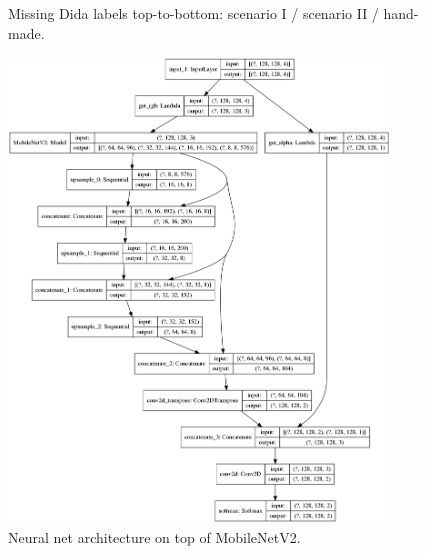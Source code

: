 \documentclass[12pt,a4paper]{article}
\begin{document}
\begin{figure}[p]
        \caption{Missing Dida labels top-to-bottom:
        scenario I / scenario II / hand-made.}
        \label{f:labels}
    \end{figure}

    
    
    \begin{figure}[p]
        \centering
        \includegraphics[width=0.9\textwidth]{images/full_model}
        \caption{Neural net architecture on top of MobileNetV2.}
        \label{f:model}
    \end{figure}
\end{document}
